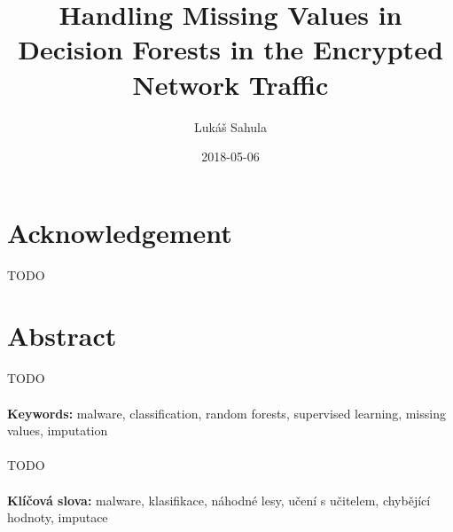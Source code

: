 \documentclass[11pt]{article}
\title{Handling Missing Values in Decision Forests in the Encrypted Network Traffic}
\date{2018-05-06}
\author{Lukáš Sahula}
\begin{document}
  \maketitle
  \newpage
  \section*{Acknowledgement}
    {\color{red}TODO}
  \newpage
  \section*{Abstract}
    {\color{red}TODO}
    \\~\\
    {\bf Keywords:} malware, classification, random forests, supervised learning, missing values, imputation 
    \\~\\
    {\color{red}TODO}
    \\~\\
    {\bf Klíčová slova:} malware, klasifikace, náhodné lesy, učení s učitelem, chybějící hodnoty, imputace 
  \newpage
  \tableofcontents
  \newpage
\end{document}

